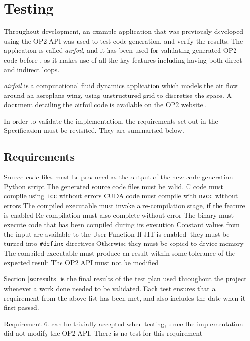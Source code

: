 
\section{Testing}
\label{s:test}
Throughout development, an example application that was previously developed using the OP2 API was used to test code generation, and verify the results. The application is called \textit{airfoil}, and it has been used for validating generated OP2 code before \cite{gpudesign}, as it makes use of all the key features including having both direct and indirect loops.
\par
\textit{airfoil} is a computational fluid dynamics application which models the air flow around an aeroplane wing, using unstructured grid to discretise the space. A document detailing the airfoil code is available on the OP2 website \cite{airfoil}.
\par
In order to validate the implementation, the requirements set out in the Specification must be revisited. They are summarised below.

\subsection{Requirements}
  \begin{outline}[enumerate]
  \1 Source code files must be produced as the output of the new code generation Python script
  \1 The generated source code files must be valid.
  \2 C code must compile using \verb|icc| without errors
  \2 CUDA code must compile with \verb|nvcc| without errors
  \1 The compiled executable must invoke a re-compilation stage, if the feature is enabled
  \2 Re-compilation must also complete without error
  \2 The binary must execute code that has been compiled during its execution
  \1 Constant values from the input are available to the User Function
  \2 If JIT is enabled, they must be turned into \verb|#define| directives
  \2 Otherwise they must be copied to device memory
  \1 The compiled executable must produce an result within some tolerance of the expected result
  \1 The OP2 API must not be modified
  \end{outline}

Section \ref{ss:results} is the final results of the test plan used throughout the project whenever a work done needed to be validated. Each test  ensures that a requirement from the above list has been met, and also includes the date when it first passed.
\par
Requirement 6. can be trivially accepted when testing, since the implementation did not modify the OP2 API. There is no test for this requirement.

